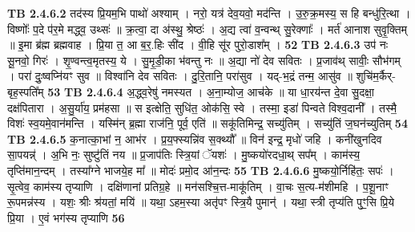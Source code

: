 \documentclass[17pt]{extarticle}
\begin{document}
                  \newline
                                \textbf{ TB 2.4.6.2} \newline
                  तद॑स्य प्रि॒यम॒भि पाथो॑ अश्याम् । नरो॒ यत्र॑ देव॒यवो॒ मद॑न्ति । उ॒रु॒क्र॒मस्य॒ स हि बन्धु॑रि॒त्था । विष्णोः᳚ प॒दे प॑र॒मे मद्ध्व॒ उथ्सः॑ ॥ क्र॒त्वा॒ दा अ॑स्थु॒ श्रेष्ठः॑ । अ॒द्य त्वा॑ व॒न्वन्थ् सु॒रेक्णाः᳚ । मर्त॑ आनाश सुवृ॒क्तिम् ॥ इ॒मा ब्र॑ह्म ब्रह्मवाह । प्रि॒या त॒ आ ब॒र॒.हिः सी॑द । वी॒हि सू॑र पुरो॒डाश᳚म् । \textbf{ 52} \newline
                  \newline
                                \textbf{ TB 2.4.6.3} \newline
                  उप॑ नः सू॒नवो॒ गिरः॑ । शृ॒ण्वन्त्व॒मृतस्य॒ ये । सु॒मृ॒डी॒का भ॑वन्तु नः ॥ अ॒द्या नो॑ देव सवितः । प्र॒जाव॑थ् सावीः॒ सौभ॑गम् । परा॑ दुः॒ष्वप्नि॑यꣳ सुव ॥ विश्वा॑नि देव सवितः । दु॒रि॒तानि॒ परा॑सुव । यद्-भ॒द्रं तन्म॒ आसु॑व ॥ शुचि॑म॒र्कैर्-बृह॒स्पति᳚म् \textbf{ 53} \newline
                  \newline
                                \textbf{ TB 2.4.6.4} \newline
                  अ॒द्ध्व॒रेषु॑ नमस्यत । अ॒ना॒म्योज॒ आच॑के ॥ या धा॒रय॑न्त दे॒वा सु॒दक्षा॒ दक्ष॑पितारा । अ॒सु॒र्या॑य॒ प्रम॑हसा ॥ स इत्क्षेति॒ सुधि॑त॒ ओक॑सि॒ स्वे । तस्मा॒ इडा॑ पिन्वते विश्व॒दानी᳚ । तस्मै॒ विशः॑ स्व॒यमे॒वान॑मन्ति । यस्मि॑न् ब्र॒ह्मा राज॑नि॒ पूर्व॒ एति॑ ॥ सकू॑तिमिन्द्र॒ सच्यु॑तिम् । सच्यु॑तिं ज॒घन॑च्युतिम् \textbf{ 54} \newline
                  \newline
                                \textbf{ TB 2.4.6.5} \newline
                  क॒नात्का॒भां न॒ आभ॑र । प्र॒य॒फ्स्यन्नि॑व स॒क्थ्यौ᳚ ॥ विन॑ इन्द्र॒ मृधो॑ जहि । कनी॑खुनदिव सा॒पयन्न्॑ । अ॒भि नः॒ सुष्टु॑तिं नय ॥ प्र॒जाप॑तिः स्त्रि॒यां ॅयशः॑ । मु॒ष्कयो॑रदधा॒थ् सप᳚म् । काम॑स्य॒ तृप्ति॑मान॒न्दम् । तस्या᳚ग्ने भाजये॒ह मा᳚ ॥ मोदः॑ प्रमो॒द आ॑न॒न्दः \textbf{ 55} \newline
                  \newline
                                \textbf{ TB 2.4.6.6} \newline
                  मु॒ष्कयो॒र्निहि॑तः॒ सपः॑ । सृ॒त्वेव॒ काम॑स्य तृप्याणि । दक्षि॑णानां प्रतिग्र॒हे ॥ मन॑सश्चि॒त्त-माकू॑तिम् । वा॒चः स॒त्य-म॑शीमहि । प॒शू॒नाꣳ रू॒पमन्न॑स्य । यशः॒ श्रीः श्र॑यतां॒ मयि॑ ॥ यथा॒ ऽहम॒स्या अतृ॑पꣳ स्त्रि॒यै पुमान्॑ । यथा॒ स्त्री तृप्य॑ति पुꣳ॒॒सि प्रि॒ये प्रि॒या । ए॒वं भग॑स्य तृप्याणि \textbf{ 56} \newline
\end{document}
